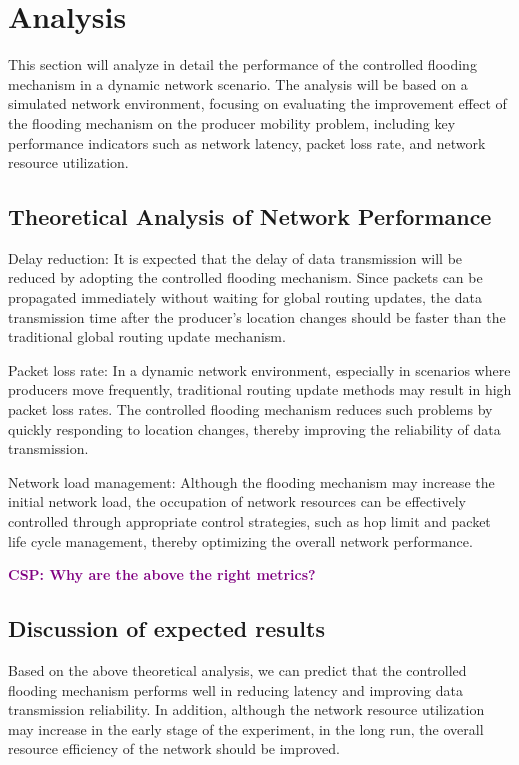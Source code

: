 \documentclass[conference]{IEEEtran}
\newcommand{\csp}[1]{\textbf{\textcolor{purple}{CSP: #1}}}
\begin{document}
\section{Analysis}
This section will analyze in detail the performance of the controlled flooding mechanism in a dynamic network scenario. The analysis will be based on a simulated network environment, focusing on evaluating the improvement effect of the flooding mechanism on the producer mobility problem, including key performance indicators such as network latency, packet loss rate, and network resource utilization.

\subsection{Theoretical Analysis of Network Performance}
Delay reduction: It is expected that the delay of data transmission will be reduced by adopting the controlled flooding mechanism. Since packets can be propagated immediately without waiting for global routing updates, the data transmission time after the producer's location changes should be faster than the traditional global routing update mechanism.

Packet loss rate: In a dynamic network environment, especially in scenarios where producers move frequently, traditional routing update methods may result in high packet loss rates. The controlled flooding mechanism reduces such problems by quickly responding to location changes, thereby improving the reliability of data transmission.

Network load management: Although the flooding mechanism may increase the initial network load, the occupation of network resources can be effectively controlled through appropriate control strategies, such as hop limit and packet life cycle management, thereby optimizing the overall network performance.

\csp{Why are the above the right metrics?}

\subsection{Discussion of expected results}
Based on the above theoretical analysis, we can predict that the controlled flooding mechanism performs well in reducing latency and improving data transmission reliability. In addition, although the network resource utilization may increase in the early stage of the experiment, in the long run, the overall resource efficiency of the network should be improved.
\end{document}
